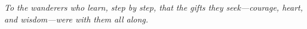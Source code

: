 \cleardoublepage
\begingroup
  \hypersetup{pageanchor=false}%
  \thispagestyle{empty}
  \vspace*{\fill}
  \begin{center}\itshape
  To the wanderers who learn, step by step, that the gifts they seek—courage, heart, and wisdom—were with them all along.
  \end{center}
  \vspace*{\fill}
  \clearpage
\endgroup